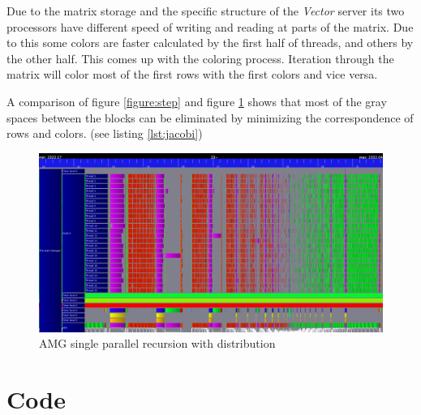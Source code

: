 \documentclass[a4paper,11pt]{scrartcl}
\begin{document}
Due to the matrix storage and the specific structure of the {\em Vector}\/
server its two processors have different speed of writing and reading at parts
of the matrix. Due to this some colors are faster calculated by the first half
of threads, and others by the other half. This comes up with the coloring process. Iteration through the matrix will color
most of the first rows with the first colors and vice versa.

A comparison of figure \ref{figure:step} and figure \ref{figure:stepdis} shows
that most of the gray spaces between the blocks can be eliminated by minimizing the
correspondence of rows and colors. (see listing \ref{lst:jacobi})

\begin{figure}
    \includegraphics[width=1\textwidth]{one_iteration.png}
    \caption{AMG single parallel recursion with distribution}\label{figure:stepdis}
\end{figure}

\pagebreak

\section{Code}
\end{document}
